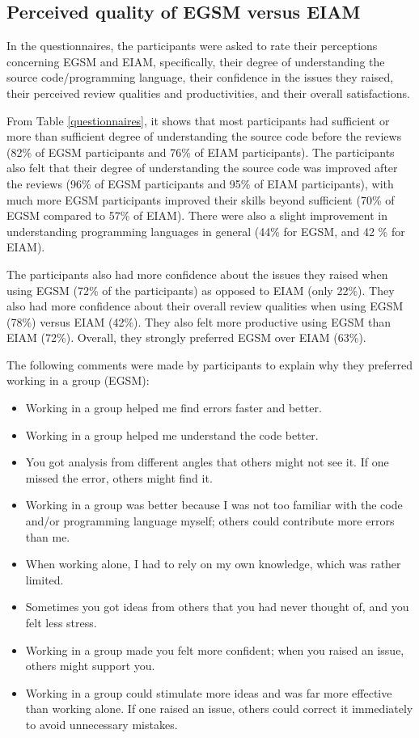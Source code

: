 \subsection {Perceived quality of EGSM versus EIAM}
\label{sec:perceived-quality}
In the questionnaires, the participants were asked to rate their
perceptions concerning EGSM and EIAM,
specifically, their degree of understanding the source
code/programming language, their confidence in the issues they
raised, their perceived review qualities and productivities, and their
overall satisfactions.

From Table \ref{questionnaires}, it shows that 
most participants had  sufficient or more than sufficient degree of
understanding the source code 
before the reviews (82\% of EGSM participants and 76\% of EIAM
participants). 
The participants also felt that their degree of understanding the
source code was improved  after the reviews (96\% of EGSM participants
and 95\% of EIAM participants), with much more EGSM participants improved
their skills beyond sufficient (70\% of EGSM compared to 57\% of
EIAM). There were also a slight improvement in understanding
programming languages in general (44\% for EGSM, and 42 \% for EIAM). 

The participants also had more confidence about the issues they raised
when using EGSM (72\% of the participants) as opposed to EIAM
(only 22\%).  They also had more confidence about their overall
review qualities when using EGSM (78\%) versus EIAM (42\%). They also
felt more productive using EGSM  than EIAM  (72\%). 
Overall, they strongly preferred EGSM over EIAM (63\%).

The following comments were made by participants to explain why they
preferred working in a group (EGSM):
\begin{itemize}
\item Working in a group helped me find errors faster and better.
\item Working in a group helped me understand the code better.
\item You got analysis from  different angles that
others might not see it. If one missed the error, others might find it.  
\item Working in a group was better because I was not too familiar with
the code and/or programming language myself; others could contribute
more errors than me.
\item When working alone, I had to rely on my own knowledge, which was
rather limited.
\item Sometimes you got ideas from others that you had never thought
of, and you felt less stress.
\item Working in a group made you felt more confident; when you raised
an issue, others might support you.
\item Working in a group could stimulate more ideas and was far more
effective than working alone. If one raised an issue, others could
correct it immediately to avoid unnecessary mistakes.
\end{itemize}


